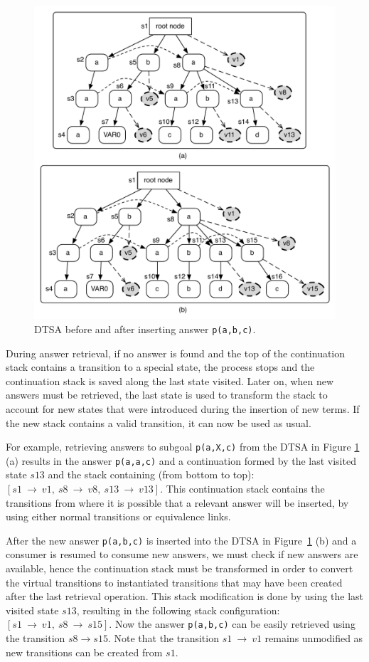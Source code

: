 \begin{figure}[ht]
  \centering
    \includegraphics[scale=0.6]{dtsa.pdf}
  \caption{DTSA before and after inserting answer \texttt{p(a,b,c)}.}
  \label{fig:dtsa_example}
\end{figure}

During answer retrieval, if no answer is found and the top of the continuation stack contains
a transition to a special state, the process stops and the continuation stack is saved along the last state
visited.
Later on, when new answers must be retrieved, the last state is used to transform the stack to account for new states that
were introduced during the insertion of new terms. If the new stack contains a valid transition, it
can now be used as usual.

For example, retrieving answers to subgoal \texttt{p(a,X,c)} from the DTSA in Figure
\ref{fig:dtsa_example} (a) results in the answer \texttt{p(a,a,c)} and a continuation
formed by the last visited state $s13$ and the stack containing (from bottom to top):
$[s1~\rightarrow~v1,~s8~\rightarrow~v8,~s13~\rightarrow~v13]$.
This continuation stack contains the transitions from where it is possible that a relevant
answer will be inserted, by using either normal transitions or equivalence links.

After the new answer \texttt{p(a,b,c)} is inserted into the DTSA in Figure~\ref{fig:dtsa_example}
(b) and a consumer is resumed to consume new answers, we must check if new answers are available,
hence the continuation stack must be transformed in order to convert the virtual transitions to
instantiated transitions that may have been created after the last retrieval operation.
This stack modification is done by using the last visited state $s13$, resulting in the following
stack configuration: $[s1~\rightarrow~v1,~s8~\rightarrow~s15]$.
Now the answer \texttt{p(a,b,c)} can be easily retrieved using the transition $s8 \rightarrow s15$.
Note that the transition $s1~\rightarrow~v1$ remains unmodified as new transitions can be created
from $s1$.

